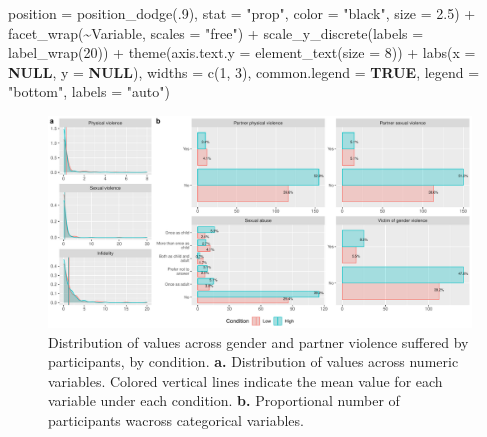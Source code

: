 \documentclass[
  bookmarksnumbered]{article}
\newenvironment{Shaded}{\begin{snugshade}}{\end{snugshade}}
\newcommand{\AttributeTok}[1]{\textcolor[rgb]{0.80,0.80,0.80}{#1}}
\newcommand{\ConstantTok}[1]{\textcolor[rgb]{0.86,0.64,0.64}{\textbf{#1}}}
\newcommand{\DecValTok}[1]{\textcolor[rgb]{0.86,0.86,0.80}{#1}}
\newcommand{\FloatTok}[1]{\textcolor[rgb]{0.75,0.75,0.82}{#1}}
\newcommand{\FunctionTok}[1]{\textcolor[rgb]{0.94,0.94,0.56}{#1}}
\newcommand{\NormalTok}[1]{\textcolor[rgb]{0.80,0.80,0.80}{#1}}
\newcommand{\SpecialCharTok}[1]{\textcolor[rgb]{0.86,0.64,0.64}{#1}}
\newcommand{\StringTok}[1]{\textcolor[rgb]{0.80,0.58,0.58}{#1}}
\begin{document}
\begin{Shaded}
\begin{Highlighting}[]
                      \AttributeTok{position =} \FunctionTok{position\_dodge}\NormalTok{(.}\DecValTok{9}\NormalTok{),}
                      \AttributeTok{stat =} \StringTok{"prop"}\NormalTok{,}
                      \AttributeTok{color =} \StringTok{"black"}\NormalTok{,}
                      \AttributeTok{size =} \FloatTok{2.5}\NormalTok{) }\SpecialCharTok{+}
            \FunctionTok{facet\_wrap}\NormalTok{(}\SpecialCharTok{\textasciitilde{}}\NormalTok{Variable, }
                               \AttributeTok{scales =} \StringTok{"free"}\NormalTok{) }\SpecialCharTok{+}
            \FunctionTok{scale\_y\_discrete}\NormalTok{(}\AttributeTok{labels =} \FunctionTok{label\_wrap}\NormalTok{(}\DecValTok{20}\NormalTok{)) }\SpecialCharTok{+}
            \FunctionTok{theme}\NormalTok{(}\AttributeTok{axis.text.y =} \FunctionTok{element\_text}\NormalTok{(}\AttributeTok{size =} \DecValTok{8}\NormalTok{)) }\SpecialCharTok{+}
            \FunctionTok{labs}\NormalTok{(}\AttributeTok{x =} \ConstantTok{NULL}\NormalTok{, }\AttributeTok{y =} \ConstantTok{NULL}\NormalTok{),}
          \AttributeTok{widths =} \FunctionTok{c}\NormalTok{(}\DecValTok{1}\NormalTok{, }\DecValTok{3}\NormalTok{),}
          \AttributeTok{common.legend =} \ConstantTok{TRUE}\NormalTok{,}
          \AttributeTok{legend =} \StringTok{"bottom"}\NormalTok{,}
          \AttributeTok{labels =} \StringTok{"auto"}\NormalTok{)}
\end{Highlighting}
\end{Shaded}

\begin{figure}
\centering
\includegraphics{Supplementary_material_files/figure-latex/gender-violence-desc-plot-1.pdf}
\caption{\label{fig:gender-violence-desc-plot}Distribution of values across gender and partner violence suffered by participants, by condition. \textbf{a.} Distribution of values across numeric variables. Colored vertical lines indicate the mean value for each variable under each condition. \textbf{b.} Proportional number of participants wacross categorical variables.}
\end{figure}
\end{document}
